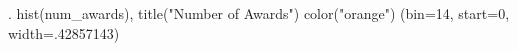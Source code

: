 . hist(num_awards), title("Number of Awards") color("orange")
(bin=14, start=0, width=.42857143)
{\smallskip}

